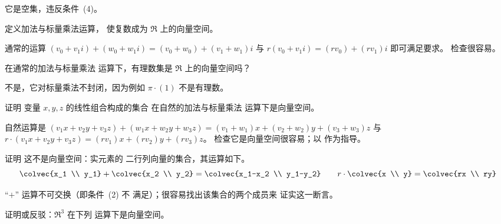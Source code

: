 \begin{exercises}
\begin{answer}
\begin{exparts}
\begin{equation*}
          \end{equation*}
        \item 它是空集，违反条件~(4)。
      \end{exparts}
    \end{answer}
  \item
    定义加法与标量乘法运算，
    使复数成为 \( \Re \) 上的向量空间。
    \begin{answer}
      通常的运算
      \( (v_0+v_1i)+(w_0+w_1i)=(v_0+w_0)+(v_1+w_1)i \) 与
      \( r(v_0+v_1i)=(rv_0)+(rv_1)i \) 即可满足要求。
      检查很容易。
    \end{answer}
  \item
    在通常的加法与标量乘法
    运算下，有理数集是 \( \Re \) 上的向量空间吗？
    \begin{answer}
       不是，它对标量乘法不封闭，因为例如
       \( \pi\cdot (1) \) 不是有理数。
    \end{answer}
  \item
    证明
    变量 \( x,y,z \) 的线性组合构成的集合
    在自然的加法与标量乘法
    运算下是向量空间。
    \begin{answer}
      自然运算是
      \( (v_1x+v_2y+v_3z)+(w_1x+w_2y+w_3z)=(v_1+w_1)x+(v_2+w_2)y+(v_3+w_3)z \)
      与 \( r\cdot(v_1x+v_2y+v_3z)=(rv_1)x+(rv_2)y+(rv_3)z \)。
      检查它是向量空间很容易；以
       作为指导。
    \end{answer}
  \item
    证明
    这不是向量空间：实元素的
    二行列向量的集合，其运算如下。
    \begin{equation*}
      \colvec{x_1 \\ y_1}
      +\colvec{x_2 \\ y_2}
      =\colvec{x_1-x_2 \\ y_1-y_2}
      \qquad
      r\cdot\colvec{x \\ y}
      =\colvec{rx \\ ry}
    \end{equation*}
    \begin{answer}
      “\( + \)” 运算不可交换（即条件~(2) 不
      满足）；很容易找出该集合的两个成员来
      证实这一断言。
    \end{answer}
  \item
    证明或反驳：\( \Re^3 \) 在下列
    运算下是向量空间。
\end{exercises}
